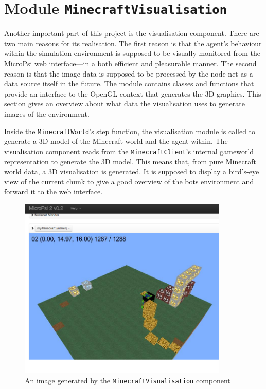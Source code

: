     \section{Module \texttt{MinecraftVisualisation}}

    
Another important part of this project is the visualisation component. There are two main reasons for its realisation. The first reason is that the agent's behaviour within the simulation environment is supposed to be visually monitored from the MicroPsi web interface---in a both efficient and pleasurable manner. The second reason is that the image data is supposed to be processed by the node net as a data source itself in the future. The module contains classes and functions that provide an interface to the OpenGL context that generates the 3D graphics. This section gives an overview about what data the visualisation uses to generate images of the environment. 

Inside the \texttt{MinecraftWorld}'s step function, the visualisation module is called to generate a 3D model of the Minecraft world and the agent within. The visualisation component reads from the \texttt{MinecraftClient}'s internal gameworld representation to generate the 3D model. This means that, from pure Minecraft world data, a 3D visualisation is generated. It is supposed to display a bird's-eye view of the current chunk to give a good overview of the bots environment and forward it to the web interface.

\begin{figure}[h]
  \centering
    \includegraphics[width=10cm]{graphics/visualisation_screen}
  \caption{An image generated by the \texttt{MinecraftVisualisation} component}
  \label{vis_screen}
\end{figure}

